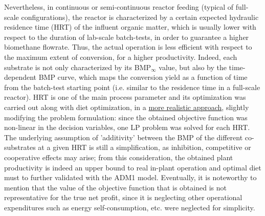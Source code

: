 Nevertheless, in continuous or semi-continuous reactor feeding (typical of full-scale configurations), the reactor is characterized by a certain expected hydraulic residence time (HRT) of the influent organic matter, which is usually lower with respect to the duration of lab-scale batch-tests, in order to guarantee a higher biomethane flowrate. Thus, the actual operation is less efficient with respect to the maximum extent of conversion, for a higher productivity. Indeed, each substrate is not only characterized by its BMP$_\infty$ value, but also by the time-dependent BMP curve, which maps the conversion yield as a function of time from the batch-test starting point (i.e. similar to the residence time in a full-scale reactor). HRT is one of the main process parameter and its optimization was carried out along with diet optimization, in a \underline{more realistic approach}, slightly modifying the problem formulation: since the obtained objective function was non-linear in the decision variables, one LP problem was solved for each HRT.
The underlying assumption of 'additivity' between the BMP of the different co-substrates at a given HRT is still a simplification, as inhibition, competitive or cooperative effects may arise; from this consideration, the obtained plant productivity is indeed an upper bound to real in-plant operation and optimal diet must to further validated with the ADM1 model.
Eventually, it is noteworthy to mention that the value of the objective function that is obtained is not representative for the true net profit, since it is neglecting other operational expenditures such as energy self-consumption, etc. were neglected for simplicity.
